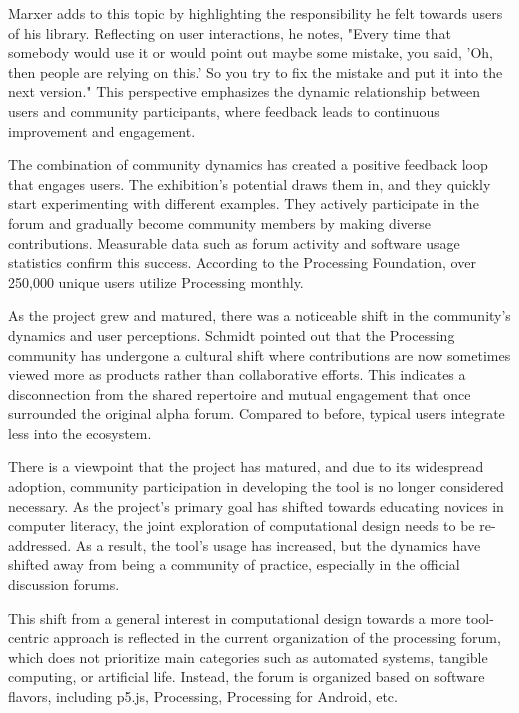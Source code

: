 Marxer adds to this topic by highlighting the responsibility he felt towards users of his library. Reflecting on user interactions, he notes, "Every time that somebody would use it or would point out maybe some mistake, you said, 'Oh, then people are relying on this.' So you try to fix the mistake and put it into the next version." This perspective emphasizes the dynamic relationship between users and community participants, where feedback leads to continuous improvement and engagement.

The combination of community dynamics has created a positive feedback loop that engages users. The exhibition's potential draws them in, and they quickly start experimenting with different examples. They actively participate in the forum and gradually become community members by making diverse contributions. Measurable data such as forum activity and software usage statistics confirm this success. According to the Processing Foundation, over 250,000 unique users utilize Processing monthly.

As the project grew and matured, there was a noticeable shift in the community's dynamics and user perceptions. Schmidt pointed out that the Processing community has undergone a cultural shift where contributions are now sometimes viewed more as products rather than collaborative efforts. This indicates a disconnection from the shared repertoire and mutual engagement that once surrounded the original alpha forum. Compared to before, typical users integrate less into the ecosystem.

There is a viewpoint that the project has matured, and due to its widespread adoption, community participation in developing the tool is no longer considered necessary. As the project's primary goal has shifted towards educating novices in computer literacy, the joint exploration of computational design needs to be re-addressed. As a result, the tool's usage has increased, but the dynamics have shifted away from being a community of practice, especially in the official discussion forums.

This shift from a general interest in computational design towards a more tool-centric approach is reflected in the current organization of the processing forum, which does not prioritize main categories such as automated systems, tangible computing, or artificial life. Instead, the forum is organized based on software flavors, including p5.js, Processing, Processing for Android, etc.

